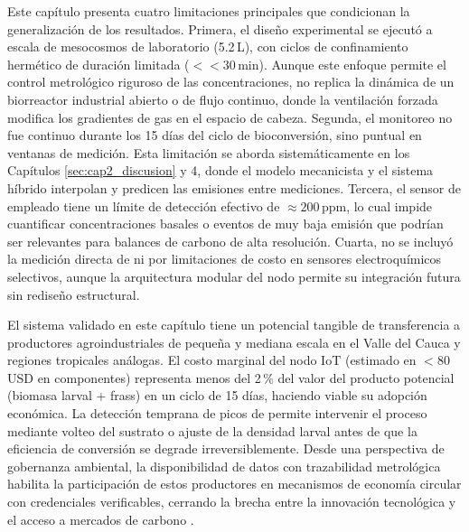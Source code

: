 Este capítulo presenta cuatro limitaciones principales que condicionan
la generalización de los resultados. Primera, el diseño experimental se
ejecutó a escala de mesocosmos de laboratorio (5.2\,L), con ciclos de
confinamiento hermético de duración limitada ($<< 30$\,min). Aunque
este enfoque permite el control metrológico riguroso de las
concentraciones, no replica la dinámica de un biorreactor industrial
abierto o de flujo continuo, donde la ventilación forzada modifica los
gradientes de gas en el espacio de cabeza. Segunda, el monitoreo no
fue continuo durante los 15 días del ciclo de bioconversión, sino
puntual en ventanas de medición. Esta limitación se aborda
sistemáticamente en los Capítulos \ref{sec:cap2_discusion} y 4,
donde el modelo mecanicista y el sistema híbrido interpolan y predicen
las emisiones entre mediciones. Tercera, el sensor de  empleado
tiene un límite de detección efectivo de $\approx 200$\,ppm, lo cual
impide cuantificar concentraciones basales o eventos de muy baja
emisión que podrían ser relevantes para balances de carbono de alta
resolución. Cuarta, no se incluyó la medición directa de  ni
 por limitaciones de costo en sensores electroquímicos
selectivos, aunque la arquitectura modular del nodo permite su
integración futura sin rediseño estructural.

El sistema validado en este capítulo tiene un potencial tangible de
transferencia a productores agroindustriales de pequeña y mediana escala
en el Valle del Cauca y regiones tropicales análogas. El costo marginal
del nodo IoT (estimado en $< 80$\,USD en componentes) representa menos
del 2\,\% del valor del producto potencial (biomasa larval + frass) en
un ciclo de 15 días, haciendo viable su adopción económica. La
detección temprana de picos de  permite intervenir el proceso
mediante volteo del sustrato o ajuste de la densidad larval antes de
que la eficiencia de conversión se degrade irreversiblemente. Desde una
perspectiva de gobernanza ambiental, la disponibilidad de datos con
trazabilidad metrológica habilita la participación de estos productores
en mecanismos de economía circular con credenciales verificables,
cerrando la brecha entre la innovación tecnológica y el acceso a
mercados de carbono \autocite{jenkinsProcessingPoultryManure2025}.

